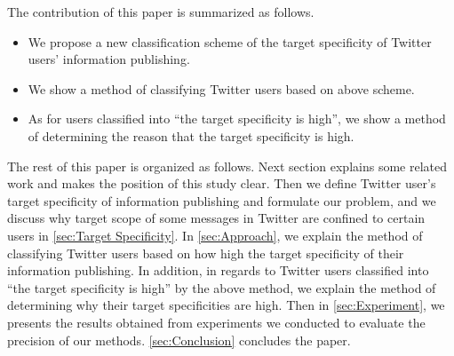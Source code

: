 The contribution of this paper is summarized as follows.

\begin{itemize}
\item We propose a new classification scheme of the target specificity
      of Twitter users' information publishing.
\item We show a method of classifying Twitter users based on above
      scheme.
\item As for users classified into ``the target specificity is high'',
      we show a method of determining the reason that the target
      specificity is high.
\end{itemize}

The rest of this paper is organized as follows. Next section explains
some related work and makes the position of this study clear.  Then we
define Twitter user's target specificity of information publishing and
formulate our problem, and we discuss why target scope of some messages
in Twitter are confined to certain users in \ref{sec:Target
Specificity}. In \ref{sec:Approach}, we explain the method of
classifying Twitter users based on how high the target specificity of
their information publishing.  In addition, in regards to Twitter users
classified into  ``the target specificity is high'' by the above method,
we explain the method of determining why their target specificities are
high.  Then in \ref{sec:Experiment}, we presents the results obtained
from experiments we conducted to evaluate the precision of our methods.
\ref{sec:Conclusion} concludes the paper.

